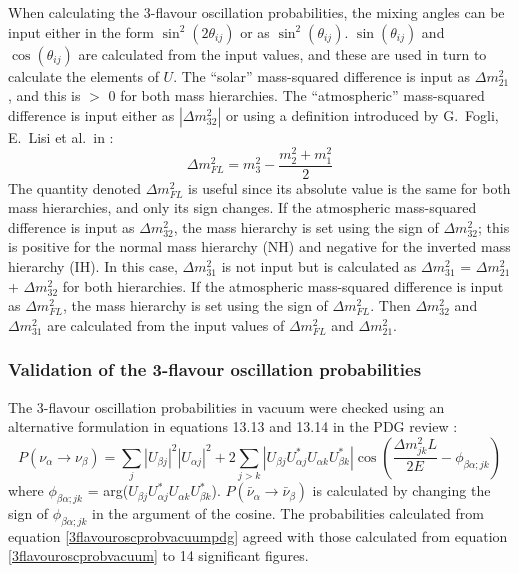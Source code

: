 When calculating the 3-flavour oscillation probabilities, the mixing angles can be input either in the form $\sin^{2}(2 \theta_{ij})$
or as $\sin^{2}(\theta_{ij})$. $\sin(\theta_{ij})$ and $\cos(\theta_{ij})$ are calculated from the input values, and these are used in
turn to calculate the elements of $U$. The ``solar'' mass-squared difference is input as $\Delta m_{21}^{2}$, and this is $>$ 0 for
both mass hierarchies. The ``atmospheric''
mass-squared difference is input either as $|\Delta m_{32}^{2}|$ or using a definition introduced by G.\ Fogli, E.\ Lisi et al.\ in
\cite{LisiGlobalAnalysis}:
\begin{equation}
\Delta m^{2}_{FL} = m_{3}^{2} - \frac{m_{2}^{2} + m_{1}^{2}}{2}
\end{equation}
The quantity denoted $\Delta m^{2}_{FL}$ is useful since its absolute value is the same for both mass hierarchies, and only its sign
changes. If the atmospheric mass-squared difference is input as $\Delta m^{2}_{32}$, the mass hierarchy is set using the sign of
$\Delta m_{32}^{2}$; this is positive for the normal mass hierarchy (NH) and negative for the inverted mass hierarchy (IH). In this case,
$\Delta m_{31}^{2}$ is not input but is calculated as $\Delta m_{31}^{2}$ = $\Delta m_{21}^{2}$ + $\Delta m_{32}^{2}$ for both hierarchies.
If the atmospheric mass-squared difference is input as $\Delta m^{2}_{FL}$, the mass hierarchy is set using the sign of $\Delta m^{2}_{FL}$.
Then $\Delta m_{32}^{2}$ and $\Delta m_{31}^{2}$ are calculated from the input values of $\Delta m^{2}_{FL}$ and $\Delta m_{21}^{2}$.

%
%
\subsubsection*{Validation of the 3-flavour oscillation probabilities}

The 3-flavour oscillation probabilities in vacuum were checked using an alternative formulation in equations 13.13 and 13.14
in the PDG review \cite{pdgreview}:
\begin{equation}
P(\nu_{\alpha} \rightarrow \nu_{\beta}) = \sum_{j} |U_{\beta j}|^{2} |U_{\alpha j}|^{2} + 2 \sum_{j>k} |U_{\beta j} U_{\alpha j}^{*} U_{\alpha k} U_{\beta k}^{*}|
\cos \left(\frac{\Delta m_{jk}^{2} L}{2E}  - \phi_{\beta \alpha;jk}  \right)
\label{3flavouroscprobvacuumpdg}
\end{equation}
where $\phi_{\beta \alpha;jk}$ = arg($U_{\beta j} U_{\alpha j}^{*} U_{\alpha k} U_{\beta k}^{*}$). $P(\bar{\nu}_{\alpha} \rightarrow \bar{\nu}_{\beta})$
is calculated by changing the sign of $\phi_{\beta \alpha;jk}$ in the argument of the cosine. The probabilities calculated from equation \ref{3flavouroscprobvacuumpdg}
agreed with those calculated from equation \ref{3flavouroscprobvacuum} to 14 significant figures.

